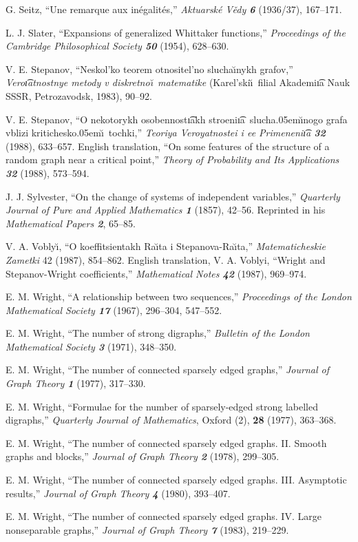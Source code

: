 \smallskip
\bib [\Sei]\enspace
G. Seitz, ``Une remarque aux in\'egalit\'es,'' 
{\sl Aktuarsk\'e V{\v e}dy\/ \bf 6} (1936/37), 167--171.

\smallskip
\bib [\Sla]\enspace
L. J. Slater, ``Expansions of generalized Whittaker functions,'' {\sl
Proceedings of the Cambridge Philosophical Society\/ \bf 50} (1954),
628--630.

\smallskip
\bib [\Si]\enspace
V. E. Stepanov, ``Neskol'ko teorem otnositel'no slucha\u{\i}nykh grafov,''
{\sl Vero\t\i atnostnye metody v diskretno\u\i\ matematike\/}
(Karel'ski\u\i\ filial Akademi\t\i a Nauk SSSR, Petrozavodsk, 1983),
90--92.

\smallskip
\bib [\Sii]\enspace
V. E. Stepanov, ``O nekotorykh osobennost\t\i akh stroeni\t\i a\
 slucha\kern.05em{\u\i}nogo grafa
vblizi kritichesko\kern.05em\u\i\ tochki,'' 
{\sl Teoriya Veroyatnostei i ee Primeneni\t\i a\/ 
\bf 32} (1988), 633--657.
English translation, ``On some features of the structure of a random graph
near a critical point,'' {\sl Theory of Probability and Its
Applications\/ \bf 32} (1988), 573--594.

\smallskip
\bib [\Syl]\enspace
J. J. Sylvester, ``On the change of systems of independent
variables,'' {\sl Quarterly Journal of Pure and Applied Mathematics\/
\bf 1} (1857), 42--56. Reprinted in his {\sl Mathematical Papers\/ \bf
2}, 65--85.

\smallskip
\bib [\Vob]\enspace
V. A. Vobly\u\i, ``O koeffitsientakh Ra{\u\i}ta i Stepanova-Ra{\u\i}ta,''
{\sl Matematicheskie Zametki\/} 42 (1987), 854--862. English translation,
V. A. Voblyi, ``Wright and Stepanov-Wright coefficients,'' {\sl Mathematical
Notes\/ \bf 42} (1987), 969--974.

\smallskip
\bib [\Wo]\enspace
E. M. Wright, ``A relationship between two sequences,'' {\sl
Proceedings of the London Mathematical Society
 \bf 17} (1967), 296--304, 547--552.

\smallskip
\bib [\Wsi]\enspace
E. M. Wright, ``The number of strong digraphs,'' {\sl Bulletin of the
London Mathematical Society\/ \bf3} (1971), 348--350.

\smallskip
\bib [\Wi]\enspace
E. M. Wright, ``The number of connected sparsely edged graphs,''
{\sl Journal of Graph Theory\/ \bf 1} (1977), 317--330.

\smallskip
\bib [\Wsii]\enspace
E. M. Wright, ``Formulae for the number of sparsely-edged strong
labelled digraphs,'' {\sl Quarterly Journal of Mathematics},
Oxford (2), {\bf 28} (1977), 363--368.

\smallskip
\bib [\Wii]\enspace
E. M. Wright, ``The number of connected sparsely edged graphs. II.
Smooth graphs and blocks,''
{\sl Journal of Graph Theory\/ \bf 2} (1978), 299--305.

\smallskip
\bib [\Wiii]\enspace
E. M. Wright, ``The number of connected sparsely edged graphs. III.
Asymptotic results,''
{\sl Journal of Graph Theory\/ \bf 4} (1980), 393--407.

\smallskip
\bib [\Wiv]\enspace
E. M. Wright, ``The number of connected sparsely edged graphs. IV.
Large nonseparable graphs,''
{\sl Journal of Graph Theory\/ \bf 7} (1983), 219--229.

\bye
